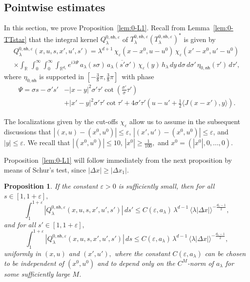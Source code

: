 \documentclass[leqno]{amsart}
\newtheorem{proposition}[theorem]{Proposition}
\theoremstyle{definition}
\theoremstyle{remark}
\numberwithin{equation}{section}
\newcommand{\R}{\mathbb{R}}
\newcommand\la{{\lambda}}
\newcommand\ve{{\varepsilon}}
\begin{document}
\subsection{Pointwise estimates} \label{pointwise0}

In this section, we prove Proposition~\ref{lem:0-L1}. Recall from Lemma~\ref{lem:0-TTstar} that the integral kernel $Q^{0,\mathsf{nh},\varepsilon}_\lambda$ of $T^{0,\mathsf{nh},\varepsilon}_\lambda (T^{0,\mathsf{nh},\varepsilon}_\lambda)^*$ is given by
\begin{multline*}
Q^{0,\mathsf{nh},\varepsilon}_\lambda(x,u,s,x',u',s')
 = \lambda^{d + 1} \, \chi_{\varepsilon}(x-x^0,u-u^0) \, \chi_{\varepsilon}(x'-x^0,u'-u^0) \\
\times \int_\R \, \int_0^\infty \! \int_0^\infty \! \int_{\R^{d_1}}e^{i\lambda\Psi} 
\,a_\lambda(s\sigma)  \,\overline{a_\lambda(s'\sigma')}  \, 
\chi_{\varepsilon}(y) \, h_\lambda \, dy \, d\sigma \, d\sigma' \, \eta_{0,\mathsf{nh}}( \tau')\,  d\tau',
\end{multline*}
where $\eta_{0,\mathsf{nh}}$ is supported in $[-\frac 3{8} \pi, \frac 3{8} \pi]$\, with phase
\begin{align*}
\Psi = \sigma s - \sigma's' & - \left|x-y\right|^2\sigma'\tau' \cot(\tfrac{\sigma'}\sigma \tau') \\ 
& + \left|x'-y\right|^2\sigma' \tau' \cot \tau' + 4\sigma'\tau'(u-u' + \tfrac12\langle J(x-x'),y \rangle).
\end{align*}


The localizations given by the cut-offs $\chi_\ve$ allow us to assume in the subsequent discussions that  $|(x,u)-(x^0,u^0)|\le \ve$, $|(x',u')-(x^0,u^0)|\le \ve$, and $|y|\le \ve.$ We recall that $|(x^0,u^0)|\le 10$,   $|x^0|\ge\frac{1}{100},$ and  $x^0=(|x^0|,0, \dots,0)$.

\medskip

Proposition~\ref{lem:0-L1} will follow immediately from the next proposition   by means of Schur's test, since $|\Delta x| \geq |\Delta x_1|$.
\begin{proposition}\label{lem:pointwiseQ0} 
If the constant $\ve>0$ is sufficiently small, then for all $s\in[1,1+\ve],$
\begin{equation}\label{sprimeintest}
\int_1^{1+\ve}| Q^{0,\mathsf{nh},\varepsilon}_\lambda(x,u,s,x',u',s')|\, ds'  
\le C(\ve,a_\la)\, \lambda^{d-1}
\, \langle\lambda\left|\Delta x\right|\rangle^{-\frac{d_1-1}2} ,
\end{equation}
and for all $s'\in[1,1+\ve],$
\begin{equation}\label{sintest}
\int_1^{1+\ve}| Q^{0,\mathsf{nh},\varepsilon}_\lambda(x,u,s,x',u',s')|\, ds 
\le C(\ve,a_\la)\, \lambda^{d-1}
\, \langle\lambda\left|\Delta x\right|\rangle^{-\frac{d_1-1}2} ,
\end{equation}
uniformly in $(x,u)$ and $(x',u'),$ 
where the  constant $C(\ve,a_\la)$ can be chosen to be independent of  $(x^0,u^0)$ and to depend only on the $C^M$-norm of $a_\la$ for some sufficiently large $M$.
\end{proposition}
\end{document}
